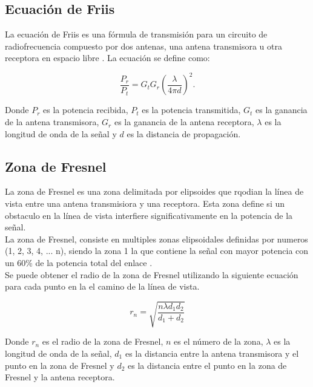 \subsection{Ecuación de Friis} \label{friis}

La ecuación de Friis es una fórmula de transmisión para un circuito de radiofrecuencia compuesto por dos antenas, una antena transmisora u otra receptora en espacio libre \cite{Friis1946}. La ecuación se define como:

\begin{equation}
    \frac{P_{r}}{P_{t}} = G_{t}G_{r}\left(\frac{\lambda}{4\pi d}\right)^{2}\text{.}
\end{equation}

Donde $P_{r}$ es la potencia recibida, $P_{t}$ es la potencia transmitida, $G_{t}$ es la ganancia de la antena transmisora, $G_{r}$ es la ganancia de la antena receptora, $\lambda$ es la longitud de onda de la señal y $d$ es la distancia de propagación.\\

\subsection{Zona de Fresnel}

La zona de Fresnel es una zona delimitada por elipsoides que rqodian la línea de vista entre una antena transmisiora y una receptora. Esta zona define si un obstaculo en la línea de vista interfiere significativamente en la potencia de la señal.\\

La zona de Fresnel, consiste en multiples zonas elipsoidales definidas por numeros (1, 2, 3, 4, ... n), siendo la zona 1 la que contiene la señal con mayor potencia con un 60\% de la potencia total del enlace \cite{cwna}.\\

Se puede obtener el radio de la zona de Fresnel utilizando la siguiente ecuación para cada punto en la el camino de la línea de vista.

\begin{equation}
    r_{n} = \sqrt{\frac{n\lambda d_{1}d_{2}}{d_{1}+d_{2}}}
\end{equation}

Donde $r_{n}$ es el radio de la zona de Fresnel, $n$ es el número de la zona, $\lambda$ es la longitud de onda de la señal, $d_{1}$ es la distancia entre la antena transmisora y el punto en la zona de Fresnel y $d_{2}$ es la distancia entre el punto en la zona de Fresnel y la antena receptora.\\

